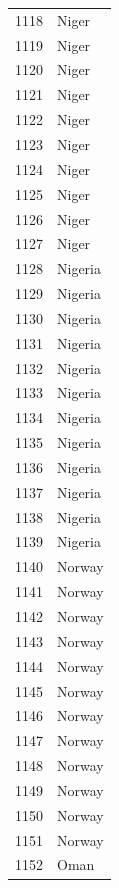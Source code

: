\documentclass[
  letterpaper,
  DIV=11,
  numbers=noendperiod]{scrreprt}
\begin{document}
\begin{tabular}{ll}
1118 &                     Niger \\
1119 &                     Niger \\
1120 &                     Niger \\
1121 &                     Niger \\
1122 &                     Niger \\
1123 &                     Niger \\
1124 &                     Niger \\
1125 &                     Niger \\
1126 &                     Niger \\
1127 &                     Niger \\
1128 &                   Nigeria \\
1129 &                   Nigeria \\
1130 &                   Nigeria \\
1131 &                   Nigeria \\
1132 &                   Nigeria \\
1133 &                   Nigeria \\
1134 &                   Nigeria \\
1135 &                   Nigeria \\
1136 &                   Nigeria \\
1137 &                   Nigeria \\
1138 &                   Nigeria \\
1139 &                   Nigeria \\
1140 &                    Norway \\
1141 &                    Norway \\
1142 &                    Norway \\
1143 &                    Norway \\
1144 &                    Norway \\
1145 &                    Norway \\
1146 &                    Norway \\
1147 &                    Norway \\
1148 &                    Norway \\
1149 &                    Norway \\
1150 &                    Norway \\
1151 &                    Norway \\
1152 &                      Oman \\

\end{tabular}
\end{document}
